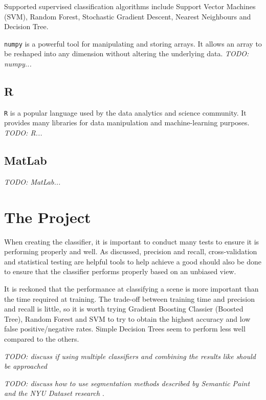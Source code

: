 \documentclass[lit_review.tex]{subfiles}
\begin{document}
Supported supervised classification algorithms include Support Vector Machines (SVM), Random Forest, Stochastic Gradient Descent, Nearest Neighbours and Decision Tree. 

\texttt{numpy} is a powerful tool for manipulating and storing arrays. It allows an array to be reshaped into any dimension without altering the underlying data. 
\textit{TODO: numpy...}

\subsection{R}
\texttt{R} is a popular language used by the data analytics and science community. It provides many libraries for data manipulation and machine-learning purposes. 
\textit{TODO: R...}

\subsection{MatLab}
\textit{TODO: MatLab...}
\newpage

\section{The Project}
When creating the classifier, it is important to conduct many tests to ensure it is performing properly and well. As discussed, precision and recall, cross-validation and statistical testing are helpful tools to help achieve a good should also be done to ensure that the classifier performs properly based on an unbiased view. 

It is reckoned that the performance at classifying a scene is more important than the time required at training. The trade-off between training time and precision and recall is little, so it is worth trying Gradient Boosting Classier (Boosted Tree), Random Forest and SVM to try to obtain the highest accuracy and low false positive/negative rates. Simple Decision Trees seem to perform less well compared to the others. 

\textit{TODO: discuss if using multiple classifiers and combining the results like \cite{forestry} should be approached}

\textit{TODO: discuss how to use segmentation methods described by Semantic Paint \cite{semantic-paint} and the NYU Dataset research \cite{nyu-dataset}}.



%
%
\end{document}
